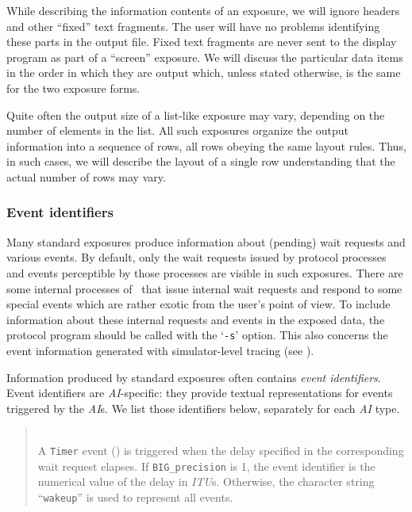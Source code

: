 While describing the information contents of an exposure, we will ignore
headers and other ``fixed'' text fragments.
The user will have no problems identifying these parts in the output file.
Fixed text fragments are never sent to the display program as part of
a ``screen'' exposure.
We will discuss the particular data items in the order in which they are
output which, unless stated otherwise, is the same for the two exposure
forms.

Quite often the output size of a list-like exposure may vary,
depending on the number of elements in the list.
All such exposures organize the output information into a sequence of
rows, all rows obeying the same layout rules.
Thus, in such cases, we will describe the layout of a single row
understanding that the actual number of rows may vary.

\subsubsection{Event identifiers}
\label{rm_ex_se_ei}

Many standard exposures produce information about (pending)
wait requests and various events.
By default, only the wait requests issued by protocol processes
and events perceptible by those processes are visible in such exposures.
There are some internal processes of \smurph\ that issue internal wait
requests and respond to some special events which are rather exotic
from the user's point of view.
To include information about these internal requests and events in
the exposed data, the protocol program should be called with the `{\tt -s}'
option.
This also concerns the event information generated with
simulator-level tracing (see ).

Information produced by standard exposures often
contains {\em event identifiers}.
Event identifiers are {\em AI\/}-specific: they provide textual
representations for events triggered by the {\em AI\/}s.
We list those identifiers below, separately for each {\em AI\/} type.

\medskip

\begin{quote}
\noindent{} \hspace{0in}\vspace{0.05in}\\
\noindent
A {\tt Timer} event ()
is triggered when the delay specified in the corresponding
wait request elapses.
If {\tt BIG\_precision} is 1, the event identifier is the numerical value of
the delay in {\em ITU\/}s.
Otherwise, the character string ``{\tt wakeup}'' is used to represent all
events.
\end{quote}

